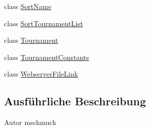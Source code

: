 \begin{DoxyCompactItemize}
\item 
class \hyperlink{classde_1_1turnierverwaltung_1_1model_1_1_sort_name}{Sort\+Name}
\item 
class \hyperlink{classde_1_1turnierverwaltung_1_1model_1_1_sort_tournament_list}{Sort\+Tournament\+List}
\item 
class \hyperlink{classde_1_1turnierverwaltung_1_1model_1_1_tournament}{Tournament}
\item 
class \hyperlink{classde_1_1turnierverwaltung_1_1model_1_1_tournament_constants}{Tournament\+Constants}
\item 
class \hyperlink{classde_1_1turnierverwaltung_1_1model_1_1_webserver_file_link}{Webserver\+File\+Link}
\end{DoxyCompactItemize}


\subsection{Ausführliche Beschreibung}
\begin{DoxyAuthor}{Autor}
mschmuck 
\end{DoxyAuthor}
